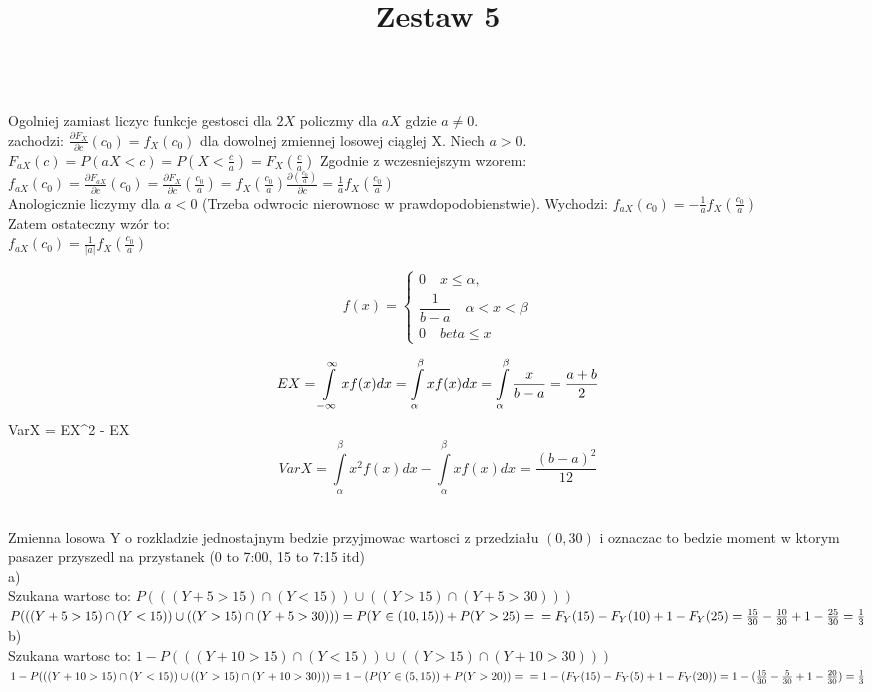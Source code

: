 \documentclass[fleqn]{article}
\begin{document}
\title{Zestaw 5}
\date{}
\medskip
{}
\medskip
\\
Ogolniej zamiast liczyc funkcje gestosci dla $2X$ policzmy dla $aX$ gdzie $a\neq 0$.\\
zachodzi: $\frac{\partial F_{X} }{\partial c}(c_{0})=f_{X}(c_{0})$ dla dowolnej zmiennej losowej ciąglej X. Niech $ a>0$.\\
$F_{aX}(c)=P(aX< c)=P(X<\frac{c}{a})=F_{X}(\frac{c}{a})$ Zgodnie z wczesniejszym wzorem:\\
$f_{aX}(c_0)=\frac{\partial F_{aX} }{\partial c}(c_{0})=\frac{\partial F_{X} }{\partial c}(\frac{c_{0}}{a})=f_{X}(\frac{c_{0}}{a})\frac{\partial (\frac{c_{0}}{a}) }{\partial c}=\frac{1}{a}f_{X}(\frac{c_{0}}{a})$\\
Anologicznie liczymy dla $a<0$ (Trzeba odwrocic nierownosc w prawdopodobienstwie). Wychodzi: $f_{aX}(c_0)=-\frac{1}{a}f_{X}(\frac{c_{0}}{a})$\\ Zatem ostateczny wzór to:\\
 $f_{aX}(c_0)=\frac{1}{|a|}f_{X}(\frac{c_{0}}{a})$


\medskip

\medskip

$$
f(x)=
\begin{cases}
0 \quad x \leq \alpha,\\
\dfrac{1}{b-a} \quad \alpha < x < \beta\\
0 \quad beta \leq x
\end{cases}
$$

$$ EX = \int\limits_{-\infty}^{\infty} xf(x)dx = 
 \int\limits_{\alpha}^{\beta} xf(x)dx = \int\limits_{\alpha}^{\beta} \frac{x}{b-a} = \frac{a + b}{2} \\ $$
VarX = EX^2 - EX \\ $$  $$
$$
VarX = \int\limits_{\alpha}^{\beta} x^2 f(x)dx - \int\limits_{\alpha}^{\beta} xf(x) dx= \frac{(b-a)^2}{12}
$$

\medskip
\\
Zmienna losowa Y o rozkladzie jednostajnym bedzie przyjmowac wartosci z przedziału $(0,30)$ i oznaczac to bedzie moment w ktorym pasazer przyszedl na przystanek (0 to 7:00, 15 to 7:15 itd)\\
a)\\
Szukana wartosc to: $P(((Y+5>15)\cap(Y<15))\cup((Y>15)\cap(Y+5>30)) )$ \\
$ P(((Y+5>15)\cap(Y<15))\cup((Y>15)\cap(Y+5>30)) )=P(Y\in(10,15))+P(Y>25)=\\
=F_{Y}(15)-F_{Y}(10)+1-F_{Y}(25)=\frac{15}{30}-\frac{10}{30}+1-\frac{25}{30}=\frac{1}{3}$\\
b)\\
Szukana wartosc to: $1-P(((Y+10>15)\cap(Y<15))\cup((Y>15)\cap(Y+10>30)) )$ \\
$ 1-P(((Y+10>15)\cap(Y<15))\cup((Y>15)\cap(Y+10>30)) )=1-(P(Y\in(5,15))+P(Y>20))=\\
=1-(F_{Y}(15)-F_{Y}(5)+1-F_{Y}(20))=1-(\frac{15}{30}-\frac{5}{30}+1-\frac{20}{30})=\frac{1}{3}$\\


\medskip
\end{document}
